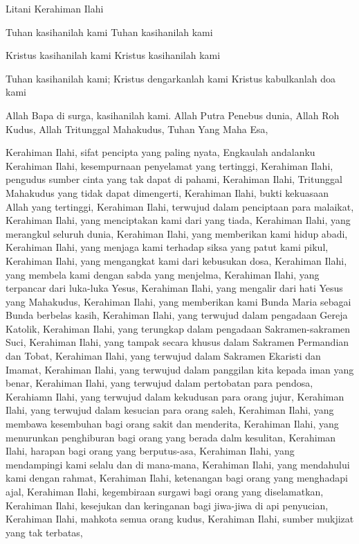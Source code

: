 \documentclass[a5paper,headsepline,titlepage,11pt,nnormalheadings,DIVcalc]{scrbook}
\begin{document}
Litani Kerahiman Ilahi

Tuhan kasihanilah kami
Tuhan kasihanilah kami

Kristus kasihanilah kami
Kristus kasihanilah kami

Tuhan kasihanilah kami; Kristus dengarkanlah kami
Kristus kabulkanlah doa kami

Allah Bapa di surga, kasihanilah kami.
Allah Putra Penebus dunia,
Allah Roh Kudus,
Allah Tritunggal Mahakudus, Tuhan Yang Maha Esa,

Kerahiman Ilahi, sifat pencipta yang paling nyata, Engkaulah andalanku
Kerahiman Ilahi, kesempurnaan penyelamat yang tertinggi,
Kerahiman Ilahi, pengudus sumber cinta yang tak dapat di pahami,
Kerahiman Ilahi, Tritunggal Mahakudus yang tidak dapat dimengerti,
Kerahiman Ilahi, bukti kekuasaan Allah yang tertinggi,
Kerahiman Ilahi, terwujud dalam penciptaan para malaikat,
Kerahiman Ilahi, yang menciptakan kami dari yang tiada,
Kerahiman Ilahi, yang merangkul seluruh dunia,
Kerahiman Ilahi, yang memberikan kami hidup abadi,
Kerahiman Ilahi, yang menjaga kami terhadap siksa yang patut kami pikul,
Kerahiman Ilahi, yang mengangkat kami dari kebusukan dosa,
Kerahiman Ilahi, yang membela kami dengan sabda yang menjelma,
Kerahiman Ilahi, yang terpancar dari luka-luka Yesus,
Kerahiman Ilahi, yang mengalir dari hati Yesus yang Mahakudus,
Kerahiman Ilahi, yang memberikan kami Bunda Maria sebagai Bunda berbelas kasih,
Kerahiman Ilahi, yang terwujud dalam pengadaan Gereja Katolik,
Kerahiman Ilahi, yang terungkap dalam pengadaan Sakramen-sakramen Suci,
Kerahiman Ilahi, yang tampak secara khusus dalam Sakramen Permandian dan Tobat,
Kerahiman Ilahi, yang terwujud dalam Sakramen Ekaristi dan Imamat,
Kerahiman Ilahi, yang terwujud dalam panggilan kita kepada iman yang benar,
Kerahiman Ilahi, yang terwujud dalam pertobatan para pendosa,
Kerahiamn Ilahi, yang terwujud dalam kekudusan para orang jujur,
Kerahiman Ilahi, yang terwujud dalam kesucian para orang saleh,
Kerahiman Ilahi, yang membawa kesembuhan bagi orang sakit dan menderita,
Kerahiman Ilahi, yang menurunkan penghiburan bagi orang yang berada dalm kesulitan,
Kerahiman Ilahi, harapan bagi orang yang berputus-asa,
Kerahiman Ilahi, yang mendampingi kami selalu dan di mana-mana,
Kerahiman Ilahi, yang mendahului kami dengan rahmat,
Kerahiman Ilahi, ketenangan bagi orang yang menghadapi ajal,
Kerahiman Ilahi, kegembiraan surgawi bagi orang yang diselamatkan,
Kerahiman Ilahi, kesejukan dan keringanan bagi jiwa-jiwa di api penyucian,
Kerahiman Ilahi, mahkota semua orang kudus,
Kerahiman Ilahi, sumber mukjizat yang tak terbatas,
\end{document}

